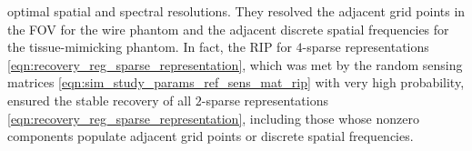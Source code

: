 optimal spatial and
spectral resolutions.
They resolved
the adjacent grid points in
the \ac{FOV} for
the wire phantom and
the adjacent discrete spatial frequencies for
the tissue-mimicking phantom.
In fact,
the \ac{RIP} for
$4$-sparse representations
\eqref{eqn:recovery_reg_sparse_representation}, which was met by
the random sensing matrices
\eqref{eqn:sim_study_params_ref_sens_mat_rip} with
very high probability, ensured
the stable recovery of
all $2$-sparse representations
\eqref{eqn:recovery_reg_sparse_representation}, including those whose
nonzero components populate
adjacent grid points or
discrete spatial frequencies.

